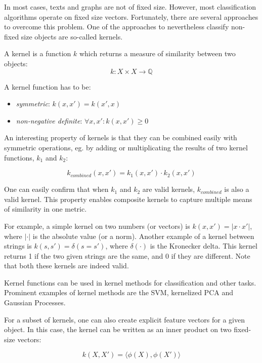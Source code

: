 In most cases, texts and graphs are not of fixed size.
However, most classification algorithms operate on fixed size vectors.
Fortunately, there are several approaches to overcome this problem.
One of the approaches to nevertheless classify non-fixed size objects are so-called kernels.

A kernel is a function $k$ which returns a measure of similarity between two objects:
\begin{equation*}
k: X \times X \rightarrow \mathbb{Q}
\end{equation*}

A kernel function has to be:
\begin{itemize}
    \item{\textit{symmetric}: $k(x, x') = k(x', x)$}
    \item{\textit{non-negative definite}: $\forall x, x': k(x, x') \geq 0$}
\end{itemize}

An interesting property of kernels is that they can be combined easily with symmetric operations, eg. by adding or multiplicating the results of two kernel functions, $k_1$ and $k_2$:

\begin{equation*}
k_{combined}(x, x') = k_1(x, x') \cdot k_2(x, x')
\end{equation*}

One can easily confirm that when $k_1$ and $k_2$ are valid kernels, $k_{combined}$ is also a valid kernel.
This property enables composite kernels to capture multiple means of similarity in one metric.

For example, a simple kernel on two numbers (or vectors) is $k(x, x') = | x \cdot x' |$, where $| \cdot |$ is the absolute value (or a norm).
Another example of a kernel between strings is $k(s, s') = \delta(s = s')$, where $\delta(\cdot)$ is the Kronecker delta. This kernel returns 1 if the two given strings are the same, and 0 if they are different.
Note that both these kernels are indeed valid.

Kernel functions can be used in kernel methods for classification and other tasks.
Prominent examples of kernel methods are the SVM, kernelized PCA and Gaussian Processes.

For a subset of kernels, one can also create explicit feature vectors for a given object. In this case, the kernel can be written as an inner product on two fixed-size vectors:

\begin{equation*}
    k(X, X') = \langle \phi(X), \phi(X') \rangle
\end{equation*}

